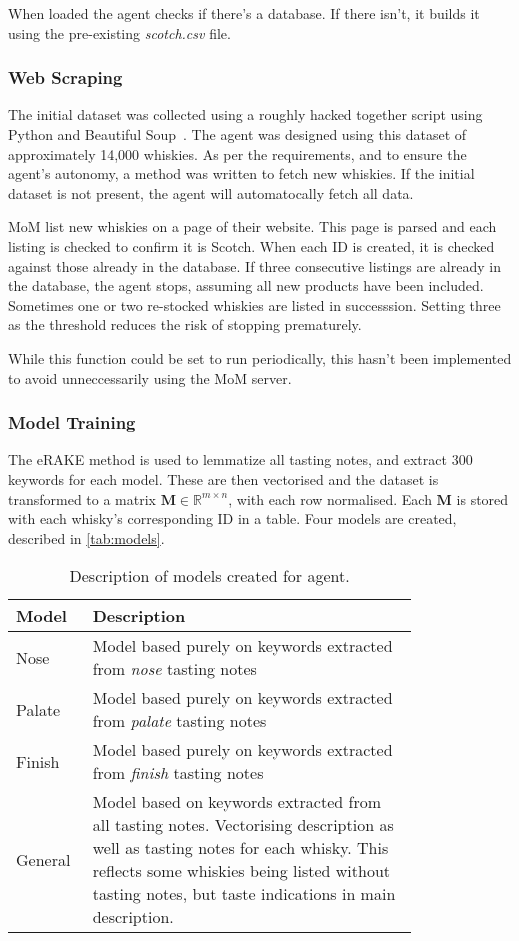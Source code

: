 When loaded the agent checks if there's a database. If there isn't, it builds it using the pre-existing \emph{scotch.csv} file.

\subsubsection{Web Scraping}\label{sssec:scrape}
The initial dataset was collected using a roughly hacked together script using Python and Beautiful 
Soup~\cite{richardson2007beautiful}. The agent was designed using this dataset of approximately 14,000
whiskies.  As per the requirements, and to ensure the agent's autonomy, a method was written to fetch new
whiskies. If the initial dataset is not present, the agent will automatocally fetch all data.

MoM list new whiskies on a page of their website.  This page is parsed and each listing
is checked to confirm it is Scotch.  When each ID is created, it is checked against those already in the
database.  If three consecutive listings are already in the database, the agent stops, assuming all new products
have been included. Sometimes one or two re-stocked whiskies are listed in successsion.
Setting three as the threshold reduces the risk of stopping prematurely.

While this function could be set to run periodically, this hasn't been implemented to avoid unneccessarily 
using the MoM server.

\subsubsection{Model Training}
The eRAKE method is used to lemmatize all tasting notes, and extract 300 keywords for each model.  These are 
then vectorised and the dataset is transformed to a matrix $\textbf{M} \in \mathbb{R}^{m \times n}$, with each
row normalised. Each $\textbf{M}$ is stored with each whisky's corresponding ID 
in a table. Four models are created, described in \autoref{tab:models}.

\begin{table}
    \centering
    \caption{Description of models created for agent.}\label{tab:models}
    \begin{tabular}{p{0.1\linewidth} p{0.7\linewidth}} 
    \toprule
    Model   & Description            \\ \midrule
    Nose    & Model based purely on keywords extracted from \emph{nose} tasting notes  \\
    Palate  & Model based purely on keywords extracted from \emph{palate} tasting notes  \\
    Finish  & Model based purely on keywords extracted from \emph{finish} tasting notes  \\
    General & Model based on keywords extracted from all tasting notes.  Vectorising description as well as tasting notes for each whisky. This reflects some whiskies being listed without tasting notes, but taste indications in main description. \\
    \bottomrule
    \end{tabular}
\end{table}

